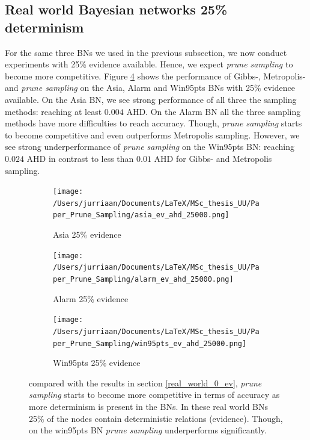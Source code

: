 \documentclass[a4paper, twoside, 11pt]{report}
\theoremstyle{plain}
\theoremstyle{definition}
\theoremstyle{remark}
\newcommand{\ps}{\textit{prune sampling }}
\begin{document}
\subsection{Real world Bayesian networks 25\% determinism}\label{real_world_25_ev}
For the same three BNs we used in the previous subsection, we now conduct experiments with 25\% evidence available. Hence, we expect \ps to become more competitive. Figure \ref{results2} shows the performance of Gibbs-, Metropolis- and \ps on the Asia, Alarm and Win95pts BNs with 25\% evidence available. On the Asia BN, we see strong performance of all three the sampling methods: reaching at least $0.004$ AHD. On the Alarm BN all the three sampling methods have more difficulties to reach accuracy. Though, \ps starts to become competitive and even outperforms Metropolis sampling. However, we see strong underperformance of \ps on the Win95pts BN: reaching $0.024$ AHD in contrast to less than $0.01$ AHD for Gibbs- and Metropolis sampling.
\begin{figure}[H]
\centering
\begin{subfigure}{0.5\textwidth}
\texttt{[image: /Users/jurriaan/Documents/LaTeX/MSc\_thesis\_UU/Paper\_Prune\_Sampling/asia\_ev\_ahd\_25000.png]}
\caption{Asia 25\% evidence}%
\label{asia}%
\end{subfigure}\hfill%
\begin{subfigure}{0.5\textwidth}
\texttt{[image: /Users/jurriaan/Documents/LaTeX/MSc\_thesis\_UU/Paper\_Prune\_Sampling/alarm\_ev\_ahd\_25000.png]}
\caption{Alarm 25\% evidence}%
\label{alarm}%
\end{subfigure}%
\begin{subfigure}{0.5\textwidth}
\texttt{[image: /Users/jurriaan/Documents/LaTeX/MSc\_thesis\_UU/Paper\_Prune\_Sampling/win95pts\_ev\_ahd\_25000.png]}
\caption{Win95pts 25\% evidence}%
\label{win95pts}%
\end{subfigure}\hfill%
\vspace{0.75pc}
\caption{compared with the results in section \ref{real_world_0_ev}, \ps starts to become more competitive in terms of accuracy as more determinism is present in the BNs. In these real world BNs 25\% of the nodes contain deterministic relations (evidence). Though, on the win95pts BN \ps underperforms significantly.}
\label{results2}
\end{figure}

\newpage
\end{document}
